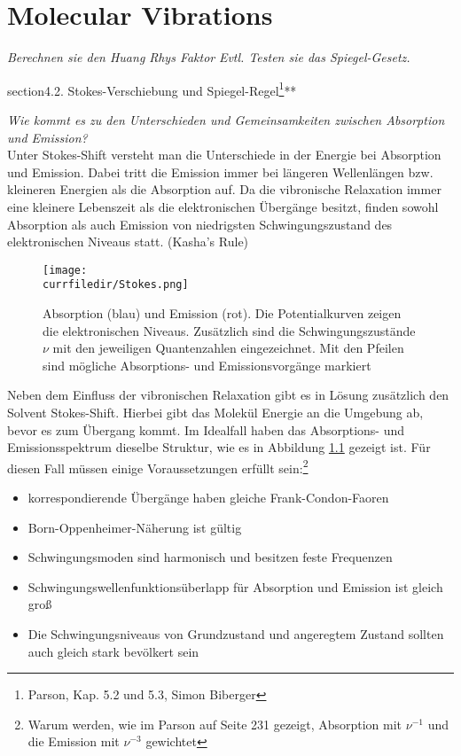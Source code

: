 

\chapter{Molecular Vibrations}

\textit{Berechnen sie den Huang Rhys Faktor 
}
\textit{Evtl. Testen sie das Spiegel-Gesetz.
}



section{4.2. Stokes-Verschiebung und Spiegel-Regel\protect\footnote{Parson, Kap. 5.2 und 5.3, Simon Biberger}\hfill ***} 

\textit{Wie kommt es zu den Unterschieden und Gemeinsamkeiten
zwischen Absorption und Emission?}\\
Unter Stokes-Shift versteht man die Unterschiede in der Energie bei Absorption und Emission. Dabei tritt die Emission immer bei längeren Wellenlängen bzw. kleineren Energien als die Absorption auf. Da die vibronische Relaxation immer eine kleinere Lebenszeit als die elektronischen Übergänge besitzt, finden sowohl Absorption als auch Emission von niedrigsten Schwingungszustand des elektronischen Niveaus statt. (Kasha's Rule)

\begin{figure}[htb]
    \centering
    \texttt{[image: \\currfiledir/Stokes.png]}
    \caption{Absorption (blau) und Emission (rot). Die Potentialkurven zeigen die elektronischen Niveaus. Zusätzlich sind die Schwingungszustände $\nu$ mit den jeweiligen Quantenzahlen eingezeichnet. Mit den Pfeilen sind mögliche Absorptions- und Emissionsvorgänge markiert}
    \label{Stokes}
\end{figure}

Neben dem Einfluss der vibronischen Relaxation gibt es in Lösung zusätzlich den Solvent Stokes-Shift. Hierbei gibt das Molekül Energie an die Umgebung ab, bevor es zum Übergang kommt. Im Idealfall haben das Absorptions- und Emissionsspektrum dieselbe Struktur, wie es in Abbildung \ref{Stokes} gezeigt ist. Für diesen Fall müssen einige Voraussetzungen erfüllt sein:\protect\footnote{Warum werden, wie im Parson auf Seite 231 gezeigt, Absorption mit $\nu^{-1}$ und die Emission mit $\nu^{-3}$ gewichtet}

\begin{itemize}
    \item korrespondierende Übergänge haben gleiche Frank-Condon-Faoren
    \item Born-Oppenheimer-Näherung ist gültig
    \item Schwingungsmoden sind harmonisch und besitzen feste Frequenzen
    \item Schwingungswellenfunktionsüberlapp für Absorption und Emission ist gleich groß
    \item Die Schwingungsniveaus von Grundzustand und angeregtem Zustand sollten auch gleich stark bevölkert sein
\end{itemize}

